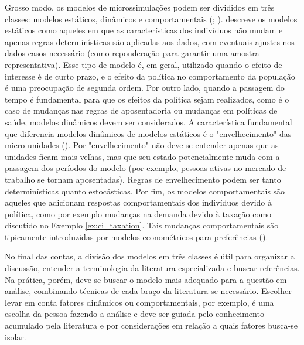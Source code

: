 \documentclass[12pt, a4paper, openany]{book}
\numberwithin{equation}{chapter}
\numberwithin{table}{chapter}
\numberwithin{figure}{chapter}
\theoremstyle{break}
\begin{document}
Grosso modo, os modelos de microssimulações podem ser divididos em três classes: modelos estáticos, dinâmicos e comportamentais (\cite[capítulo~1]{mitton2000microsimulation};  \cite{figari2015}). \textcite{figari2015} descreve os modelos estáticos como aqueles em que as características dos indivíduos não mudam e apenas regras determinísticas são aplicadas aos dados, com eventuais ajustes nos dados casos necessário (como reponderação para garantir uma amostra representativa). Esse tipo de modelo é, em geral, utilizado quando o efeito de interesse é de curto prazo, e o efeito da política no comportamento da população é uma preocupação de segunda ordem. Por outro lado, quando a passagem do tempo é fundamental para que os efeitos da política sejam realizados, como é o caso de mudanças nas regras de aposentadoria ou mudanças em políticas de saúde, modelos dinâmicos devem ser considerados. A característica fundamental que diferencia modelos dinâmicos de modelos estáticos é o "envelhecimento" das micro unidades (\cite[capítulo~1]{mitton2000microsimulation}). Por "envelhecimento" não deve-se entender apenas que as unidades ficam mais velhas, mas que seu estado potencialmente muda com a passagem dos períodos do modelo (por exemplo, pessoas ativas no mercado de trabalho se tornam aposentadas). Regras de envelhecimento podem ser tanto determinísticas quanto estocásticas. Por fim, os modelos comportamentais são aqueles que adicionam respostas comportamentais dos indivíduos devido à política, como por exemplo mudanças na demanda devido à taxação como discutido no Exemplo \ref{ex:ci_taxation}. Tais mudanças comportamentais são tipicamente introduzidas por modelos econométricos para preferências (\cite{figari2015}).

No final das contas, a divisão dos modelos em três classes é útil para organizar a discussão, entender a terminologia da literatura especializada e buscar referências. Na prática, porém, deve-se buscar o modelo mais adequado para a questão em análise, combinando técnicas de cada braço da literatura se necessário. Escolher levar em conta fatores dinâmicos ou comportamentais, por exemplo, é uma escolha da pessoa fazendo a análise e deve ser guiada pelo conhecimento acumulado pela literatura e por considerações em relação a quais fatores busca-se isolar. 
\end{document}
